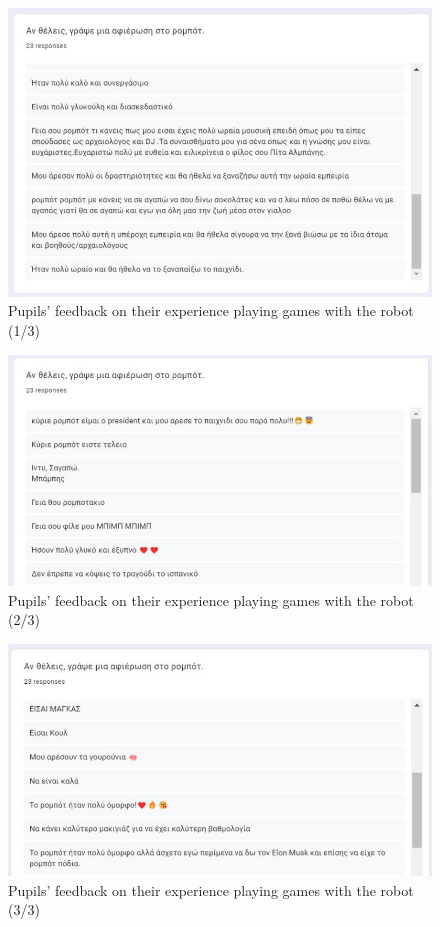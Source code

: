 \begin{figure}[H]\centering
  \includegraphics[scale=0.8]{images/cultureid/indy_kids_0.jpg}
  \caption{\small Pupils' feedback on their experience playing games with
           the robot (1/3)}
  \label{fig:cultureid_indy_kids_0}
\end{figure}
\begin{figure}[H]\centering
  \includegraphics[scale=0.8]{images/cultureid/indy_kids_1.jpg}
  \caption{\small Pupils' feedback on their experience playing games with
           the robot (2/3)}
  \label{fig:cultureid_indy_kids_1}
\end{figure}
\begin{figure}[H]\centering
  \includegraphics[scale=0.8]{images/cultureid/indy_kids_2.jpg}
  \caption{\small Pupils' feedback on their experience playing games with
           the robot (3/3)}
  \label{fig:cultureid_indy_kids_2}
\end{figure}



